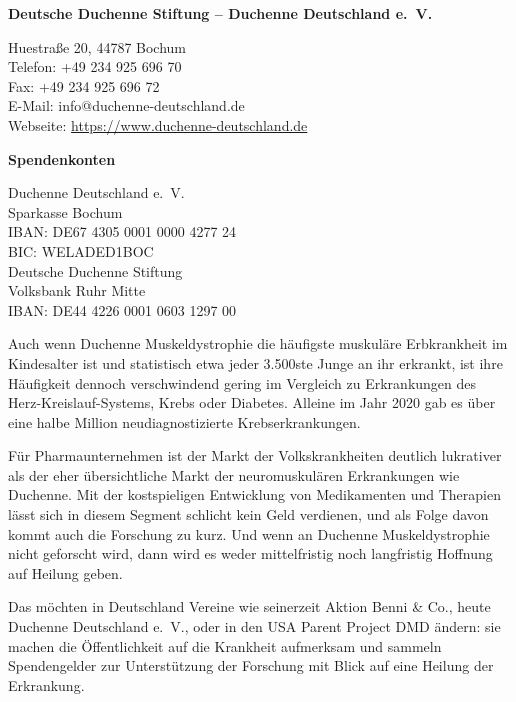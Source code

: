 \documentclass[fontsize=14pt,a4paper,headinclude,DIV=calc,automark]{scrbook}
\begin{document}
\begin{tcolorbox}
\vspace{0.8\baselineskip}
\textbf{Deutsche Duchenne Stiftung – Duchenne Deutschland e.~V.}

Huestraße 20, 44787 Bochum\\
Telefon: +49 234 925 696 70\\
Fax: +49 234 925 696 72\\
E-Mail: info@duchenne-deutschland.de\\
Webseite: \url{https://www.duchenne-deutschland.de}

\vspace{0.8\baselineskip}
\textbf{Spendenkonten}

Duchenne Deutschland e.~V.\\
Sparkasse Bochum\\
IBAN: DE67 4305 0001 0000 4277 24\\
BIC: WELADED1BOC\\
Deutsche Duchenne Stiftung\\
Volksbank Ruhr Mitte\\
IBAN: DE44 4226 0001 0603 1297 00

\end{tcolorbox}

\vspace{0.8\baselineskip}

\noindent Auch wenn Duchenne Muskeldystrophie die häufigste muskuläre Erbkrankheit im Kindesalter ist und statistisch etwa jeder 3.500ste Junge an ihr erkrankt, ist ihre Häufigkeit dennoch verschwindend gering im Vergleich zu Erkrankungen des Herz-Kreislauf-Systems, Krebs oder Diabetes. Alleine im Jahr 2020 gab es über eine halbe Million neudiagnostizierte Krebserkrankungen.

Für Pharmaunternehmen ist der Markt der Volkskrankheiten deutlich lukrativer als der eher übersichtliche Markt der neuromuskulären Erkrankungen wie Duchenne. Mit der kostspieligen Entwicklung von Medikamenten und Therapien lässt sich in diesem Segment schlicht kein Geld verdienen, und als Folge davon kommt auch die Forschung zu kurz. Und wenn an Duchenne Muskeldystrophie nicht geforscht wird, dann wird es weder mittelfristig noch langfristig Hoffnung auf Heilung geben.

Das möchten in Deutschland Vereine wie seinerzeit Aktion Benni \& Co., heute Duchenne Deutschland e.~V., oder in den USA Parent Project DMD ändern: sie machen die Öffentlichkeit auf die Krankheit aufmerksam und sammeln Spendengelder zur Unterstützung der Forschung mit Blick auf eine Heilung der Erkrankung.
\end{document}
